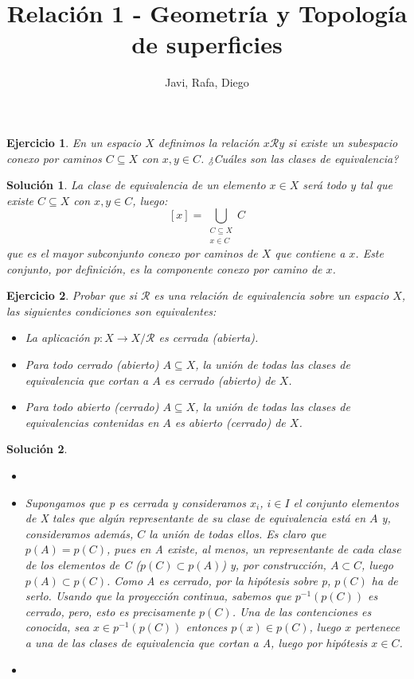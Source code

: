\documentclass{article}
\theoremstyle{plain}
\newtheorem{exercise}{Ejercicio}
\newtheorem*{sol*}{Solución}
\begin{document}
\title{Relación 1 - Geometría y Topología de superficies }
\author{Javi, Rafa, Diego}
\maketitle
\begin{exercise}
En un espacio $X$ definimos la relación $x \mathcal{R} y$ si existe un subespacio conexo por caminos $C \subseteq X$ con $x,y \in C$. ¿Cuáles son las clases de equivalencia?
\end{exercise}
\begin{sol*}
La clase de equivalencia de un elemento $x \in X$ será todo $y$ tal que existe $C \subseteq X$ con $x, y \in C$, luego:
\[ [x] = \bigcup_{\substack{C \subseteq X \\ x \in C}} C \]
que es el mayor subconjunto conexo por caminos de $X$ que contiene a $x$. Este conjunto, por definición, es la componente conexo por camino de $x$.
\end{sol*}

\newpage
\begin{exercise}
Probar que si $\mathcal{R}$ es una relación de equivalencia sobre un espacio $X$, las siguientes condiciones son equivalentes:
\begin{itemize}
	\item La aplicación $p : X \to X/\mathcal{R}$ es cerrada (abierta).
	\item Para todo cerrado (abierto) $A \subseteq X$, la unión de todas las clases de equivalencia que cortan a $A$ es cerrado (abierto) de $X$.
	\item Para todo abierto (cerrado) $A \subseteq X$, la unión de todas las clases de equivalencias contenidas en $A$ es abierto (cerrado) de $X$.
\end{itemize}
\end{exercise}
\begin{sol*}
\begin{itemize}
\item[]
\item Supongamos que p es cerrada y consideramos $x_i$, $i\in I$ el conjunto elementos de X tales que algún representante de su clase de equivalencia está en $A$ y, consideramos además, $C$ la unión de todas ellos. Es claro que $p(A) = p(C)$, pues en A existe, al menos, un representante de cada clase de los elementos de C ($p(C)\subset p(A)$) y, por construcción, $A\subset C$, luego $p(A)\subset p(C)$. Como A es cerrado, por la hipótesis sobre p, $p(C)$ ha de serlo. Usando que la proyección continua, sabemos que $p^{-1}(p(C))$ es cerrado, pero, esto es precisamente $p(C)$. Una de las contenciones es conocida, sea $x\in p^{-1}(p(C))$ entonces $p(x) \in p(C)$, luego $x$ pertenece a una de las clases de equivalencia que cortan a A, luego por hipótesis $x\in C$.
\item 
\end{itemize}
\end{sol*}
\end{document}
